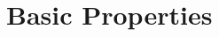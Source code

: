\ifcsname\PATH\endcsname
    \newcommand{\PATH}{books/Algebra/Fields}
\else
    \renewcommand{\PATH}{books/Algebra/Fields}
\fi
\chapter{Basic Properties}
    